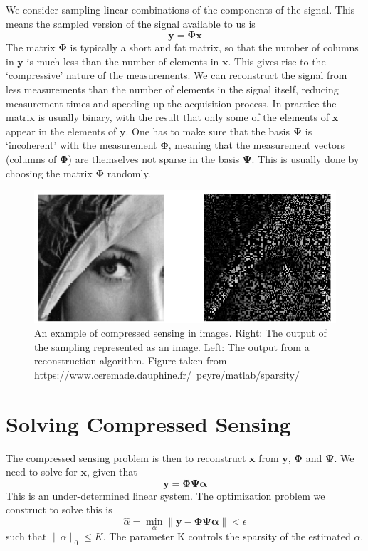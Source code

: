 \documentclass[letterpaper, 10 pt, conference]{article}
\begin{document}
We consider sampling linear combinations of the components of the signal. This means the sampled version of the signal available to us is 
$$\mathbf{y} = \mathbf{\Phi x}$$
The matrix $\mathbf{\Phi}$ is typically a short and fat matrix, so that the number of columns in $\mathbf{y}$ is much less than the number of elements in $\mathbf{x}$. This gives rise to the `compressive' nature of the measurements. We can reconstruct the signal from less measurements than the number of elements in the signal itself, reducing measurement times and speeding up the acquisition process. In practice the matrix is usually binary, with the result that only some of the elements of $\mathbf{x}$ appear in the elements of $\mathbf{y}$. One has to make sure that the basis $\mathbf{\Psi}$ is `incoherent' with the measurement $\mathbf{\Phi}$, meaning that the measurement vectors (columns of $\mathbf{\Phi}$) are themselves not sparse in the basis $\mathbf{\Psi}$. This is usually done by choosing the matrix $\mathbf{\Phi}$ randomly.

\begin{figure}[thpb]
      \centering
      \includegraphics[scale=0.5]{cs-example}
      \caption{An example of compressed sensing in images. Right: The output of the sampling represented as an image. Left: The output from a reconstruction algorithm. Figure taken from https://www.ceremade.dauphine.fr/~peyre/matlab/sparsity/}
      \label{figurelabel}
\end{figure}

\section{Solving Compressed Sensing}

The compressed sensing problem is then to reconstruct $\mathbf{x}$ from $\mathbf{y}$, $\mathbf{\Phi}$ and $\mathbf{\Psi}$. We need to solve for $\mathbf{x}$, given that $$\mathbf{y} = \mathbf{\Phi \Psi \alpha}$$ This is an under-determined linear system. The optimization problem we construct to solve this is
$$\hat{\alpha} = \min_\alpha \|\mathbf{y} - \mathbf{\Phi \Psi \alpha}\| < \epsilon$$
such that $\|\alpha\|_0 \leq K$. The parameter K controls the sparsity of the estimated $\alpha$.
\end{document}
